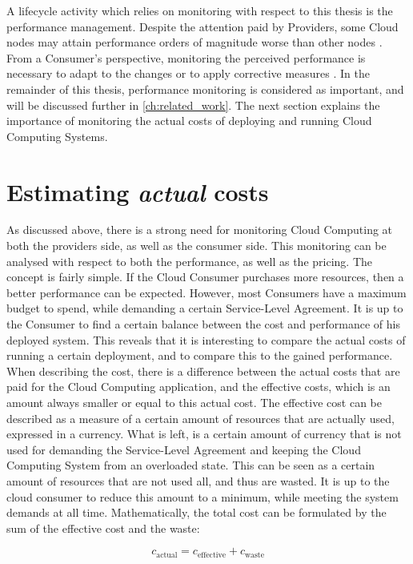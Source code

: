 \noindent
A lifecycle activity which relies on monitoring with respect to this thesis is the performance management. Despite the attention paid by Providers, some Cloud nodes may attain performance orders of magnitude worse than other nodes \cite{fox2009above}. From a Consumer's perspective, monitoring the perceived performance is necessary to adapt to the changes or to apply corrective measures \cite{aceto2013cloud}. In the remainder of this thesis, performance monitoring is considered as important, and will be discussed further in \autoref{ch:related_work}. The next section explains the importance of monitoring the actual costs of deploying and running Cloud Computing Systems.

\section{Estimating \textit{actual} costs} \label{sec:intro_pricing}
As discussed above, there is a strong need for monitoring Cloud Computing at both the providers side, as well as the consumer side. This monitoring can be analysed with respect to both the performance, as well as the pricing. The concept is fairly simple. If the Cloud Consumer purchases more resources, then a better performance can be expected. However, most Consumers have a maximum budget to spend, while demanding a certain Service-Level Agreement. It is up to the Consumer to find a certain balance between the cost and performance of his deployed system. This reveals that it is interesting to compare the actual costs of running a certain deployment, and to compare this to the gained performance. When describing the cost, there is a difference between the actual costs that are paid for the Cloud Computing application, and the effective costs, which is an amount always smaller or equal to this actual cost. The effective cost can be described as a measure of a certain amount of resources that are actually used, expressed in a currency. What is left, is a certain amount of currency that is not used for demanding the Service-Level Agreement and keeping the Cloud Computing System from an overloaded state. This can be seen as a certain amount of resources that are not used all, and thus are wasted. It is up to the cloud consumer to reduce this amount to a minimum, while meeting the system demands at all time. Mathematically, the total cost can be formulated by the sum of the effective cost and the waste:

\begin{equation}\label{eq:intro}
  c_\text{actual} = c_\text{effective} + c_\text{waste}  
\end{equation}


